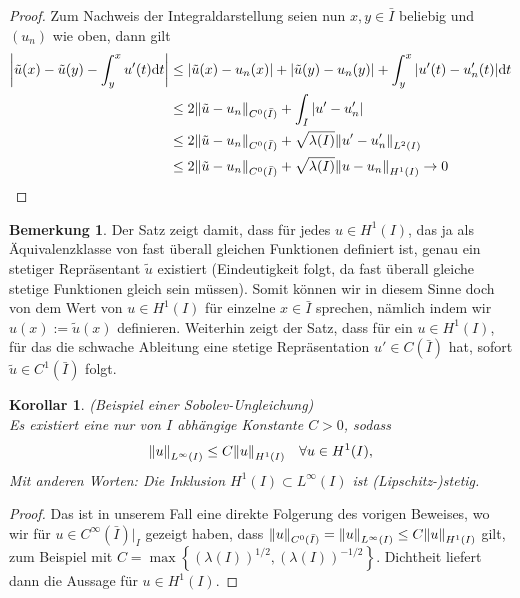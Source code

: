 \documentclass[twoside]{article}
\newtheorem{corollary}[theorem]{Korollar}
\theoremstyle{definition}
\newtheorem{remark}[theorem]{Bemerkung}
\begin{document}
\begin{proof}
Zum Nachweis der Integraldarstellung seien nun $x,y \in \bar{I}$ beliebig und $(u_n)$ wie oben, dann gilt
\begin{align*}
\abs{\tilde{u}(x)-\tilde{u}(y) - \int_y^x u'(t) \dd t} &\leq \abs{\tilde{u}(x)-u_n(x)} + \abs{\tilde{u}(y)-u_n(y)} + \int_y^x \abs{u'(t) - u_n'(t)} \dd t\\
&\leq 2 \norm{\tilde{u}-u_n}_{C^0(\bar{I})} + \int_I \abs{u'-u_n'}\\
&\leq 2 \norm{\tilde{u}-u_n}_{C^0(\bar{I})} + \sqrt{\lambda(I)} \norm{u'-u_n'}_{L^2(I)}\\
&\leq 2 \norm{\tilde{u}-u_n}_{C^0(\bar{I})} + \sqrt{\lambda(I)} \norm{u-u_n}_{H^1(I)} \to 0
\end{align*}
\end{proof}
\begin{remark}
Der Satz zeigt damit, dass für jedes $u \in H^1(I)$, das ja als Äquivalenzklasse von fast überall gleichen Funktionen definiert ist, genau ein stetiger Repräsentant $\tilde{u}$ existiert (Eindeutigkeit folgt, da fast überall gleiche stetige Funktionen gleich sein müssen). Somit können wir in diesem Sinne doch von dem Wert von $u \in H^1(I)$ für einzelne $x \in \bar{I}$ sprechen, nämlich indem wir $u(x) := \tilde{u}(x)$ definieren. Weiterhin zeigt der Satz, dass für ein $u \in H^1(I)$, für das die schwache Ableitung eine stetige Repräsentation $u' \in C(\bar{I})$ hat, sofort $\tilde{u} \in C^1(\bar{I})$ folgt.
\end{remark}
\begin{corollary} (Beispiel einer Sobolev-Ungleichung) \label{thm:einbett}\\
Es existiert eine nur von $I$ abhängige Konstante $C > 0$, sodass
\begin{align}
\norm{u}_{L^\infty(I)} \leq C \norm{u}_{H^1(I)} \quad \forall u \in H^1(I), \label{eq:einbett}
\end{align}
Mit anderen Worten: Die Inklusion $H^1(I) \subset L^{\infty}(I)$ ist (Lipschitz-)stetig.
\end{corollary}
\begin{proof}
Das ist in unserem Fall eine direkte Folgerung des vorigen Beweises, wo wir für $u \in C^\infty(\bar{I})\vert_I$ gezeigt haben, dass $\norm{u}_{C^0(\bar{I})} = \norm{u}_{L^\infty(I)} \leq C \norm{u}_{H^1(I)}$ gilt, zum Beispiel mit $C = \max \left\{\left(\lambda(I)\right)^{1/2},\left(\lambda(I)\right)^{-1/2} \right\}$. Dichtheit liefert dann die Aussage für $u \in H^1(I)$.
\end{proof}
\end{document}
